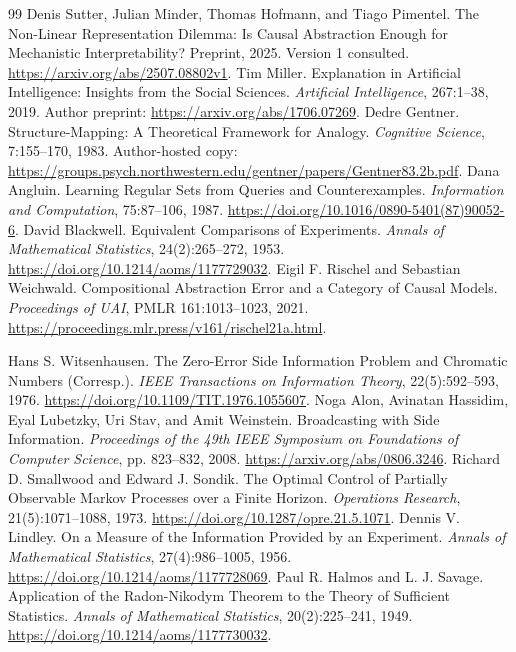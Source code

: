\documentclass[11pt,letterpaper]{article}
\theoremstyle{plain}
\theoremstyle{definition}
\begin{document}
\begin{thebibliography}{99}
 Denis Sutter, Julian Minder, Thomas Hofmann, and Tiago Pimentel. The Non-Linear Representation Dilemma: Is Causal Abstraction Enough for Mechanistic Interpretability? Preprint, 2025. Version 1 consulted. \url{https://arxiv.org/abs/2507.08802v1}.
 Tim Miller. Explanation in Artificial Intelligence: Insights from the Social Sciences. \emph{Artificial Intelligence}, 267:1--38, 2019. Author preprint: \url{https://arxiv.org/abs/1706.07269}.
 Dedre Gentner. Structure-Mapping: A Theoretical Framework for Analogy. \emph{Cognitive Science}, 7:155--170, 1983. Author-hosted copy: \url{https://groups.psych.northwestern.edu/gentner/papers/Gentner83.2b.pdf}.
 Dana Angluin. Learning Regular Sets from Queries and Counterexamples. \emph{Information and Computation}, 75:87--106, 1987. \url{https://doi.org/10.1016/0890-5401(87)90052-6}.
 David Blackwell. Equivalent Comparisons of Experiments. \emph{Annals of Mathematical Statistics}, 24(2):265--272, 1953. \url{https://doi.org/10.1214/aoms/1177729032}.
 Eigil F. Rischel and Sebastian Weichwald. Compositional Abstraction Error and a Category of Causal Models. \emph{Proceedings of UAI}, PMLR 161:1013--1023, 2021. \url{https://proceedings.mlr.press/v161/rischel21a.html}.

 Hans S. Witsenhausen. The Zero-Error Side Information Problem and Chromatic Numbers (Corresp.). \emph{IEEE Transactions on Information Theory}, 22(5):592--593, 1976. \url{https://doi.org/10.1109/TIT.1976.1055607}.
 Noga Alon, Avinatan Hassidim, Eyal Lubetzky, Uri Stav, and Amit Weinstein. Broadcasting with Side Information. \emph{Proceedings of the 49th IEEE Symposium on Foundations of Computer Science}, pp. 823--832, 2008. \url{https://arxiv.org/abs/0806.3246}.
 Richard D. Smallwood and Edward J. Sondik. The Optimal Control of Partially Observable Markov Processes over a Finite Horizon. \emph{Operations Research}, 21(5):1071--1088, 1973. \url{https://doi.org/10.1287/opre.21.5.1071}.
 Dennis V. Lindley. On a Measure of the Information Provided by an Experiment. \emph{Annals of Mathematical Statistics}, 27(4):986--1005, 1956. \url{https://doi.org/10.1214/aoms/1177728069}.
 Paul R. Halmos and L. J. Savage. Application of the Radon-Nikodym Theorem to the Theory of Sufficient Statistics. \emph{Annals of Mathematical Statistics}, 20(2):225--241, 1949. \url{https://doi.org/10.1214/aoms/1177730032}.
\end{thebibliography}
\end{document}
